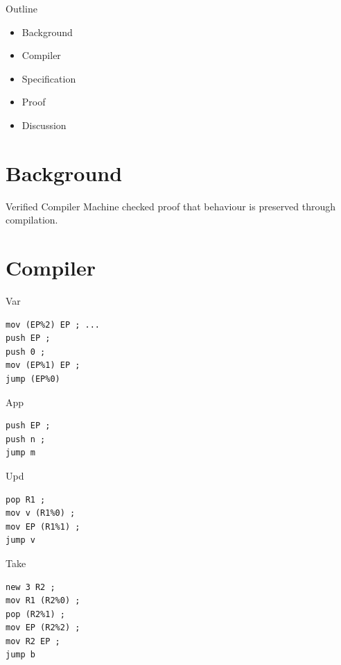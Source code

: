 \documentclass[14pt]{beamer}
\begin{document}
\begin{frame}{Outline}
\begin{itemize}
\item Background
\item Compiler
\item Specification 
\item Proof
\item Discussion
\end{itemize}
\end{frame}
\section{Background}

\begin{frame}{Verified Compiler}
Machine checked proof that behaviour is preserved through compilation.
\end{frame}

\section{Compiler}

\begin{frame}[fragile]{Var}
\begin{lstlisting}
mov (EP%2) EP ; ... 
push EP ;
push 0 ;
mov (EP%1) EP ;
jump (EP%0)
\end{lstlisting}
\end{frame}

\begin{frame}[fragile]{App}
\begin{lstlisting}
push EP ;
push n ;
jump m 
\end{lstlisting}
\end{frame}

\begin{frame}[fragile]{Upd}
\begin{lstlisting}
pop R1 ;
mov v (R1%0) ;
mov EP (R1%1) ;
jump v 
\end{lstlisting}
\end{frame}

\begin{frame}[fragile]{Take}
\begin{lstlisting}
new 3 R2 ;
mov R1 (R2%0) ;
pop (R2%1) ;
mov EP (R2%2) ;
mov R2 EP ;
jump b
\end{lstlisting}
\end{frame}
\end{document}
